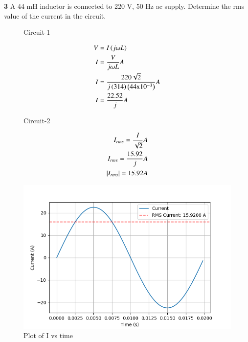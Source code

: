 \documentclass[journal,12pt,twocolumn]{IEEEtran}
\begin{document}


\vspace{3cm}

\title{}
\author{EE23BTECH11047 - Deepakreddy P
}
\maketitle
\newpage
\bigskip


\noindent \textbf{3} \quad A 44 mH inductor is connected to 220 V, 50 Hz ac supply. Determine
the rms value of the current in the circuit.\\
\solution


\begin{figure}[ht]
  \centering
  \begin{adjustbox}{width=\columnwidth}
      
  \end{adjustbox}
  \caption{Circuit-1}
\end{figure}

\begin{align}
    V &= I \left(j \omega L\right) \\
    I &= \frac{V}{j \omega L} A \\
    I &= \frac{220 \sqrt{2}}{j \left(314\right) \left(44 \text{x} 10^{-3}\right)}A\\
    I &= \frac{22.52}{j}A
\end{align}


\begin{figure}[ht]
  \centering
  \begin{adjustbox}{width=\columnwidth}
      
  \end{adjustbox}
  \caption{Circuit-2}
\end{figure}

\begin{align}
    I_{rms} = \frac{I}{\sqrt{2}}A\\
    I_{rms} = \frac{15.92}{j}A\\
    \left\vert I_{rms}\right\vert = 15.92 A
\end{align}

\begin{figure}[ht]
   \centering
   \includegraphics[width=1.1\columnwidth]{figs/ac.png}
   \caption{Plot of I vs time}
\end{figure}
\end{document}
